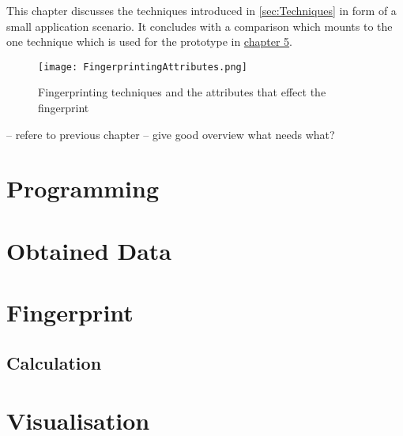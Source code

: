 This chapter discusses the techniques introduced in \autoref{sec:Techniques} in form of a small application scenario. It concludes with a comparison which mounts to the one technique which is used for the prototype in \hyperref[cha:implementation]{chapter 5}.

\begin{figure}[H]
	\centering
	\texttt{[image: FingerprintingAttributes.png]}
	\caption{Fingerprinting techniques and the attributes that effect the fingerprint}
	\label{BrowserSpecification}
\end{figure}

-- refere to previous chapter
-- give good overview what needs what?


\section{Programming}


\section{Obtained Data}


\section{Fingerprint}

\subsection{Calculation}

\section{Visualisation}